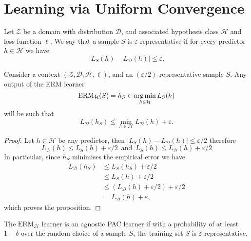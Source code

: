 \section{Learning via Uniform Convergence}

\begin{definition}
\label{def:epsilon-representative-sample}
Let \(\mathcal{Z}\) be a domain with distribution \(\mathcal{D}\), and
associated hypothesis class \(\mathcal{H}\) and loss function \(\ell\). We say
that a sample \(S\) is \(\varepsilon\)-representative if for every predictor \(h
\in \mathcal{H}\) we have
\[
|L_S(h) - L_{\mathcal{D}}(h)| \leq \varepsilon.
\]
\end{definition}

\begin{lemma}
\label{lem:epsilon-representative-good-erm-output}
Consider a context \((\mathcal{Z}, \mathcal{D}, \mathcal{H}, \ell)\), and an
\((\varepsilon/2)\)-representative sample \(S\). Any output of the ERM learner
\[
\text{ERM}_{\mathcal{H}}(S) = h_S \in \operatorname*{arg\,min}_{h \in \mathcal{H}} L_S(h)
\]
will be such that
\[
L_{\mathcal{D}}(h_S) \leq \min_{h \in \mathcal{H}} L_{\mathcal{D}}(h) + \varepsilon.
\]
\end{lemma}

\begin{proof}
Let \(h \in \mathcal{H}\) be any predictor, then
\(|L_S(h) - L_{\mathcal{D}}(h)| \leq \varepsilon/2\) therefore
\[
L_{\mathcal{D}}(h) \leq L_S(h) + \varepsilon/2
\, \text{ and }\,
L_S(h) \leq L_{\mathcal{D}}(h) + \varepsilon/2
\]
In particular, since \(h_S\)
minimises the empirical error we have
\begin{align*}
  L_{\mathcal{D}}(h_S)
  &\leq L_S(h_S) + \varepsilon/2 \\
  &\leq L_S(h) + \varepsilon/2 \\
  &\leq (L_{\mathcal{D}}(h) + \varepsilon/2) + \varepsilon/2 \\
  &= L_{\mathcal{D}}(h) + \varepsilon,
\end{align*}
which proves the proposition.
\end{proof}

\begin{corollary}
\label{cor:erm-is-agnostic-pac-learner-sufficient-condition}
The \(\text{ERM}_{\mathcal{H}}\) learner is an agnostic PAC learner if with a
probability of at least \(1- \delta\) over the random choice of a sample \(S\),
the training set \(S\) is \(\varepsilon\)-representative.
\end{corollary}

